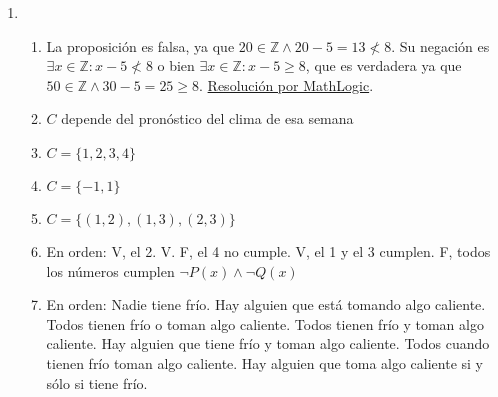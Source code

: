\documentclass[a4paper]{article}
\newcommand{\exercise}{\item}
\newcommand{\then}{\to}
\begin{document}
\begin{enumerate}
\begin{enumerate} [label=(\alph*)]
		\item $P(x)$: $x$ es un número natural \\ $Q(x)$: $x$ es par \\ $R(x)$: $x$ es impar \\ $\exists x ( P(x) \then  Q(x) \lor  R(x) )$
		\item $D(x)$: $x$ duerme \\ $S(x)$: $x$ tiene sueño \\ $J(x)$: $x$ es joven \\ $A(x)$: $x$ es arquitecto \\ $R(x)$: $x$ escucha la radio \\ $C(x)$: $x$ usa la computadora \\ $\neg D(Ana)$ \\ $\forall x ( S(x) \then  D(x) )$ \\ $\exists x ( J(x) \land  S(x) )$ \\ $\forall x ( A(x) \land  \neg S(x) \then  R(x) )$ \\ $\forall x ( J(x) \then  S(x) \lor  C(x) )$ \\ $A(Marcos) \land  C(Marcos)$ \\ $\neg \exists x ( R(x) \land  C(x) )$ \\ $\exists x (\neg A(x) \land  R(x) \land  S(x) )$
\end{enumerate}\exercise\begin{enumerate} [label=(\alph*)]		\item La proposición es falsa, ya que $20 \in \mathbb{Z} \land 20-5 = 13 \nless 8$. Su negación es $\exists x \in \mathbb{Z}: x-5 \nless 8$ o bien $\exists x \in \mathbb{Z}: x-5 \geq 8$, que es verdadera ya que $50 \in \mathbb{Z} \land 30-5 = 25 \geq 8$. \href{https://youtu.be/rnaCiSpVtP4?t=303}{Resolución por MathLogic}.
		\item $C$ depende del pronóstico del clima de esa semana
		\item $C = \{1,2,3,4\}$
		\item $C = \{-1,1\}$
		\item $C = \{ (1,2), (1,3), (2,3) \}$
		\item En orden: V, el 2. V. F, el 4 no cumple. V, el 1 y el 3 cumplen. F, todos los números cumplen $\neg P(x) \land  \neg Q(x)$ 
		\item En orden: Nadie tiene frío. Hay alguien que está tomando algo caliente. Todos tienen frío o toman algo caliente.  Todos tienen frío y toman algo caliente. Hay alguien que tiene frío y toman algo caliente. Todos cuando tienen frío toman algo caliente. Hay alguien que toma algo caliente si y sólo si tiene frío.

\end{enumerate}
\end{enumerate}
\end{document}
